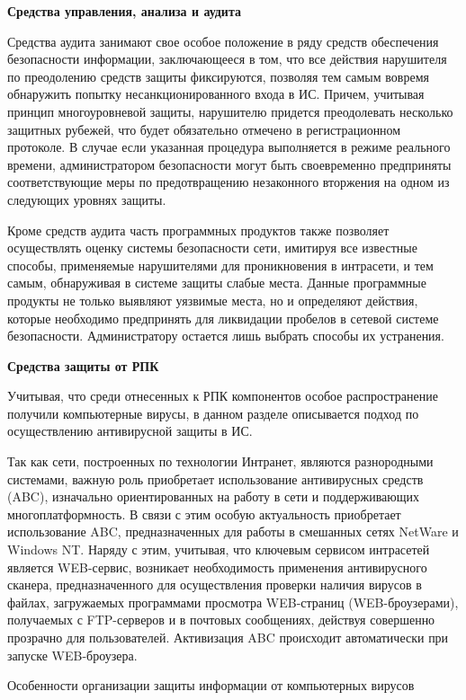 \bigbreak
\textbf{Средства управления, анализа и аудита}

Средства аудита занимают свое особое положение в ряду средств обеспечения безопасности информации, заключающееся в том, что все действия нарушителя по преодолению средств защиты фиксируются, позволяя тем самым вовремя обнаружить попытку несанкционированного входа в ИС. Причем, учитывая принцип многоуровневой защиты, нарушителю придется преодолевать несколько защитных рубежей, что будет обязательно отмечено в регистрационном протоколе. В случае если указанная процедура выполняется в режиме реального времени, администратором безопасности могут быть своевременно предприняты соответствующие меры по предотвращению незаконного вторжения на одном из следующих уровнях защиты.

Кроме средств аудита часть программных продуктов также позволяет осуществлять оценку системы безопасности сети, имитируя все известные способы, применяемые нарушителями для проникновения в интрасети, и тем самым, обнаруживая в системе защиты слабые места. Данные программные продукты не только выявляют уязвимые места, но и определяют действия, которые необходимо предпринять для ликвидации пробелов в сетевой системе безопасности. Администратору остается лишь выбрать способы их устранения.

\bigbreak
\textbf{Средства защиты от РПК}

Учитывая, что среди отнесенных к РПК компонентов особое распространение получили компьютерные вирусы, в данном разделе описывается подход по осуществлению антивирусной защиты в ИС.

Так как сети, построенных по технологии Интранет, являются разнородными системами, важную роль приобретает использование антивирусных средств (ABC), изначально ориентированных на работу в сети и поддерживающих многоплатформность. В связи с этим особую актуальность приобретает использование ABC, предназначенных для работы в смешанных сетях NetWare и Windows NT. Наряду с этим, учитывая, что ключевым сервисом интрасетей является WEB-сервис, возникает необходимость применения антивирусного сканера, предназначенного для осуществления проверки наличия вирусов в файлах, загружаемых программами просмотра WEB-страниц (WEB-броузерами), получаемых с FTP-серверов и в почтовых сообщениях, действуя совершенно прозрачно для пользователей. Активизация ABC происходит автоматически при запуске WEB-броузера.

Особенности организации защиты информации от компьютерных вирусов


